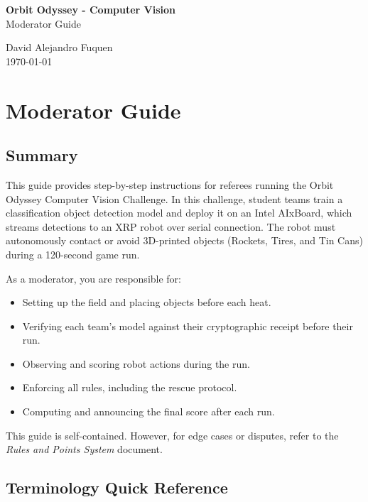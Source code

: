 \documentclass[a4]{article}
\begin{document}
    
    \thispagestyle{fancy}
    
    \begin{center}
        \textbf{\large Orbit Odyssey - Computer Vision} \\
        {Moderator Guide}
        
        \vspace{0.7em}
    
        David Alejandro Fuquen \\
    
        {\small \today}
    
    \end{center}
    
\section*{Moderator Guide}

\subsection*{Summary}

This guide provides step-by-step instructions for referees running the Orbit Odyssey Computer Vision Challenge. In this challenge, student teams train a classification object detection model and deploy it on an Intel AIxBoard, which streams detections to an XRP robot over serial connection. The robot must autonomously contact or avoid 3D-printed objects (Rockets, Tires, and Tin Cans) during a 120-second game run.

As a moderator, you are responsible for:
\begin{itemize}
    \item Setting up the field and placing objects before each heat.
    \item Verifying each team's model against their cryptographic receipt before their run.
    \item Observing and scoring robot actions during the run.
    \item Enforcing all rules, including the rescue protocol.
    \item Computing and announcing the final score after each run.
\end{itemize}

This guide is self-contained. However, for edge cases or disputes, refer to the \textit{Rules and Points System} document.

\subsection*{Terminology Quick Reference}
\end{document}
